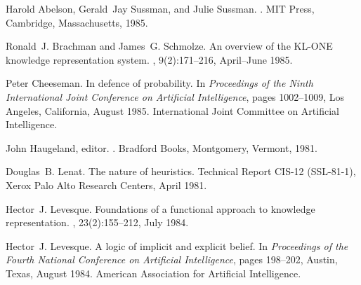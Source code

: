 \documentclass{article}
\begin{document}
%
%
\begin{thebibliography}{}

Harold Abelson, Gerald~Jay Sussman, and Julie Sussman.
.
\newblock MIT Press, Cambridge, Massachusetts, 1985.

Ronald~J. Brachman and James~G. Schmolze.
\newblock An overview of the {KL-ONE} knowledge representation system.
, 9(2):171--216, April--June 1985.

Peter Cheeseman.
\newblock In defence of probability.
\newblock In {\em Proceedings of the Ninth International Joint Conference on
  Artificial Intelligence}, pages 1002--1009, Los Angeles, California, August
  1985. International Joint Committee on Artificial Intelligence.

John Haugeland, editor.
.
\newblock Bradford Books, Montgomery, Vermont, 1981.

Douglas~B. Lenat.
\newblock The nature of heuristics.
\newblock Technical Report CIS-12 (SSL-81-1), Xerox Palo Alto Research Centers,
  April 1981.

Hector~J. Levesque.
\newblock Foundations of a functional approach to knowledge representation.
, 23(2):155--212, July 1984.

Hector~J. Levesque.
\newblock A logic of implicit and explicit belief.
\newblock In {\em Proceedings of the Fourth National Conference on Artificial
  Intelligence}, pages 198--202, Austin, Texas, August 1984. American
  Association for Artificial Intelligence.

\end{thebibliography}
\end{document}

